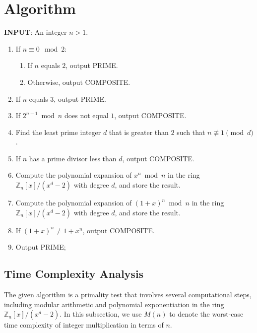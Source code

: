 \documentclass{article}
\theoremstyle{plain}
\theoremstyle{definition}
\newcommand{\Z}{\mathbb{Z}}
\newcommand{\Mx}{\Z_n[x]/(x^d-2)}
\begin{document}
\section{Algorithm} \label{section:algorithm}
\textbf{INPUT}: An integer $n > 1$.
\begin{center}
    \begin{enumerate}
        \item If $n \equiv 0 \mod{2}$:
            \begin{enumerate}
                \item If $n$ equals $2$, output PRIME.
                \item Otherwise, output COMPOSITE.
            \end{enumerate}
        \item If $n$ equals $3$, output PRIME.
        \item If $2^{n-1} \bmod{n}$ does not equal $1$, output COMPOSITE.
        \item Find the least prime integer $d$ that is greater than $2$ such that $n \not\equiv 1 \pmod{d}$.
        \item If $n$ has a prime divisor less than $d$, output COMPOSITE.
        \item Compute the polynomial expansion of $x^n \bmod{n}$ in the ring $\Z_n[x]/(x^d-2)$ with degree $d$, and store the result.
        \item Compute the polynomial expansion of $(1 + x)^n \bmod{n}$ in the ring $\Z_n[x]/(x^d-2)$ with degree $d$, and store the result.
        \item If $(1 + x)^n \not= 1 + x^n$, output COMPOSITE.
        \item Output PRIME;
    \end{enumerate}
\end{center}

\subsection{Time Complexity Analysis} \label{subsection:timecomplexity}
The given algorithm is a primality test that involves several computational steps, including modular arithmetic and polynomial exponentiation in the ring $\Mx$. In this subsection, we use $M(n)$ to denote the worst-case time complexity of integer multiplication in terms of $n$.
\end{document}
